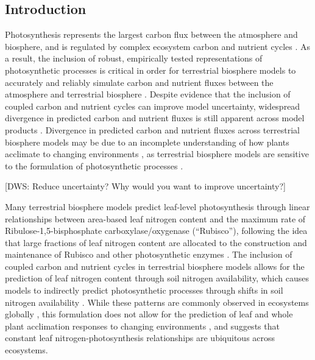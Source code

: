 \begin{singlespace}
    \chapter{\textbf{Introduction}}
\end{singlespace}

Photosynthesis represents the largest carbon flux between the atmosphere and biosphere, and is regulated by complex ecosystem carbon and nutrient cycles . As a result, the inclusion of robust, empirically tested representations of photosynthetic processes is critical in order for terrestrial biosphere models to accurately and reliably simulate carbon and nutrient fluxes between the atmosphere and terrestrial biosphere . Despite evidence that the inclusion of coupled carbon and nutrient cycles can improve model uncertainty, widespread divergence in predicted carbon and nutrient fluxes is still
apparent across model products . Divergence in predicted carbon and nutrient fluxes across terrestrial biosphere models may be due to an incomplete understanding of how plants acclimate to changing environments , as terrestrial biosphere models are sensitive to the formulation of photosynthetic processes .

[DWS: Reduce uncertainty? Why would you want to improve uncertainty?]

Many terrestrial biosphere models predict leaf-level photosynthesis through linear relationships between area-based leaf nitrogen content and the maximum rate of Ribulose-1,5-bisphosphate carboxylase/oxygenase (``Rubisco''), following the idea that large fractions of leaf nitrogen content are allocated to the construction and maintenance of Rubisco and other photosynthetic enzymes . The inclusion of coupled carbon and nutrient cycles in terrestrial biosphere models  allows for the prediction of leaf nitrogen content through soil nitrogen availability, which causes models to indirectly predict photosynthetic processes through shifts in soil nitrogen availability . While these patterns are commonly observed in ecosystems globally , this formulation does not allow for the prediction of leaf and whole plant acclimation responses to changing environments , and suggests that constant leaf nitrogen-photosynthesis relationships are ubiquitous across ecosystems. 

